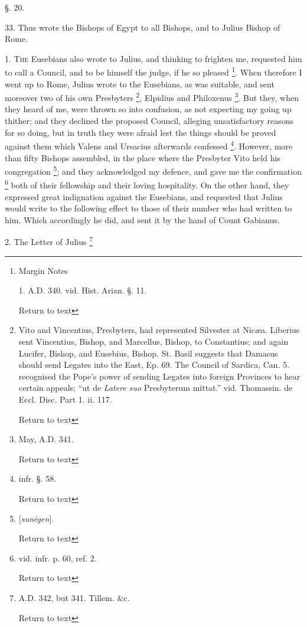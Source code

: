 §. 20.

33. Thus wrote the Bishops of Egypt to all
Bishops, and to Julius Bishop of Rome.


1. T\textsc{he} Eusebians also wrote
to Julius, and thinking to frighten me, requested him to call a
Council, and to be himself the judge, if he so pleased \footnote{Margin Notes

1. A.D.
340. vid. Hist. Arian. §. 11.

Return to text}. When therefore I went up to Rome, Julius wrote to the
Eusebians, as was suitable, and sent moreover two of his own
Presbyters \footnote{Vito and Vincentius, Presbyters, had
represented Silvester at Nicæa. Liberius sent Vincentius, Bishop, and
Marcellus, Bishop, to Constantius; and again Lucifer, Bishop, and
Eusebius, Bishop. St. Basil suggests that Damasus should send Legates
into the East, Ep. 69. The Council of Sardica, Can. 5. recognised the
Pope's power of sending Legates into foreign Provinces to hear certain
appeals; ``ut de \emph{Latere suo} Presbyterum mittat.'' vid. Thomassin.
de Eccl. Disc. Part 1. ii. 117.

Return to text}, Elpidius and
Philoxenus \footnote{May, A.D. 341.

Return to text}. But they,
when they heard of me, were thrown so into confusion, as not expecting
my going up thither; and they declined the proposed Council, alleging
unsatisfactory reasons for so doing, but in truth they were afraid
lest the things should be proved against them which Valens and
Ursacius afterwards confessed \footnote{infr. §. 58.

Return to text}. However, more than fifty Bishops assembled, in the place where
the Presbyter Vito held his congregation \footnote{[\emph{sun\={e}gen}].

Return to text}; and they acknowledged my defence, and gave me the confirmation
\footnote{vid. infr. p. 60, ref. 2.

Return to text} both of their
fellowship and their loving hospitality. On the other hand, they
expressed great indignation against the Eusebians, and requested that
Julius would write to the following effect to those of their number
who had written to him. Which accordingly he did, and sent it by the
hand of Count Gabianus.

2. The Letter of Julius \footnote{A.D.
342, but 341. Tillem. \&c.

Return to text}

